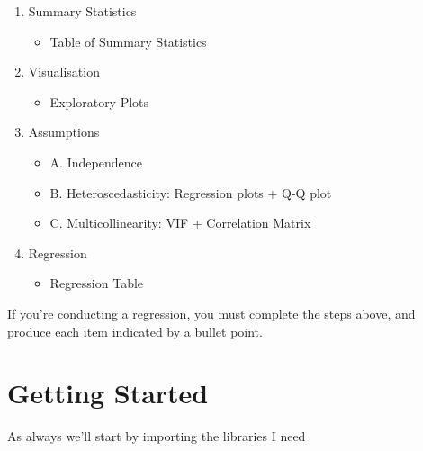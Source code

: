 \documentclass[
  letterpaper,
  DIV=11,
  numbers=noendperiod]{scrreprt}
\providecommand{\tightlist}{%
  \setlength{\itemsep}{0pt}\setlength{\parskip}{0pt}}\usepackage{longtable,booktabs,array}
\begin{document}
\begin{enumerate}
\def\labelenumi{\arabic{enumi}.}
\tightlist
\item
  Summary Statistics

  \begin{itemize}
  \tightlist
  \item
    Table of Summary Statistics
  \end{itemize}
\item
  Visualisation

  \begin{itemize}
  \tightlist
  \item
    Exploratory Plots
  \end{itemize}
\item
  Assumptions

  \begin{itemize}
  \tightlist
  \item
    A. Independence
  \item
    B. Heteroscedasticity: Regression plots + Q-Q plot
  \item
    C. Multicollinearity: VIF + Correlation Matrix
  \end{itemize}
\item
  Regression

  \begin{itemize}
  \tightlist
  \item
    Regression Table
  \end{itemize}
\end{enumerate}

If you're conducting a regression, you must complete the steps above,
and produce each item indicated by a bullet point.

\hypertarget{getting-started-3}{%
\section{Getting Started}\label{getting-started-3}}

As always we'll start by importing the libraries I need
\end{document}
